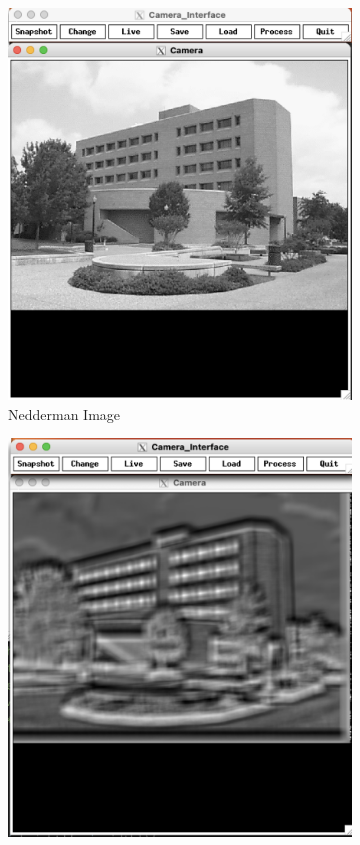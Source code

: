 \documentclass[12pt]{article}
\begin{document}
\begin{figure}
	\centering
	\begin{subfigure}[b]{0.475\textwidth}
		\centering
		\includegraphics[width=\textwidth]{hw3_results/nedderman}
		\caption[]%
		{{\small Nedderman Image}}    
		\label{fig:ned}
	\end{subfigure}
	\hfill
	\begin{subfigure}[b]{0.475\textwidth}  
		\centering 
		\includegraphics[width=\textwidth]{hw3_results/p2_window_template}

\end{subfigure}
\end{figure}
\end{document}
